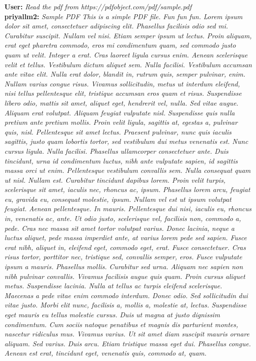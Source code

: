 \documentclass[11pt,addpoints,answers]{exam}
\begin{document}
\begin{questions}
\begin{tcolorbox}[fit,height=14cm, width=16cm, blank, borderline={1pt}{-2pt},nobeforeafter]
    \textbf{User:} \textit{Read the pdf from https://pdfobject.com/pdf/sample.pdf}
    \\
    \textbf{priyallm2:} \textit{Sample PDF This is a simple PDF file. Fun fun fun. Lorem ipsum dolor sit amet, consectetuer adipiscing elit. Phasellus facilisis odio sed mi. Curabitur suscipit. Nullam vel nisi. Etiam semper ipsum ut lectus. Proin aliquam, erat eget pharetra commodo, eros mi condimentum quam, sed commodo justo quam ut velit. Integer a erat. Cras laoreet ligula cursus enim. Aenean scelerisque velit et tellus. Vestibulum dictum aliquet sem. Nulla facilisi. Vestibulum accumsan ante vitae elit. Nulla erat dolor, blandit in, rutrum quis, semper pulvinar, enim. Nullam varius congue risus. Vivamus sollicitudin, metus ut interdum eleifend, nisi tellus pellentesque elit, tristique accumsan eros quam et risus. Suspendisse libero odio, mattis sit amet, aliquet eget, hendrerit vel, nulla. Sed vitae augue. Aliquam erat volutpat. Aliquam feugiat vulputate nisl. Suspendisse quis nulla pretium ante pretium mollis. Proin velit ligula, sagittis at, egestas a, pulvinar quis, nisl. Pellentesque sit amet lectus. Praesent pulvinar, nunc quis iaculis sagittis, justo quam lobortis tortor, sed vestibulum dui metus venenatis est. Nunc cursus ligula. Nulla facilisi. Phasellus ullamcorper consectetuer ante. Duis tincidunt, urna id condimentum luctus, nibh ante vulputate sapien, id sagittis massa orci ut enim. Pellentesque vestibulum convallis sem. Nulla consequat quam ut nisl. Nullam est. Curabitur tincidunt dapibus lorem. Proin velit turpis, scelerisque sit amet, iaculis nec, rhoncus ac, ipsum. Phasellus lorem arcu, feugiat eu, gravida eu, consequat molestie, ipsum. Nullam vel est ut ipsum volutpat feugiat. Aenean pellentesque. In mauris. Pellentesque dui nisi, iaculis eu, rhoncus in, venenatis ac, ante. Ut odio justo, scelerisque vel, facilisis non, commodo a, pede. Cras nec massa sit amet tortor volutpat varius. Donec lacinia, neque a luctus aliquet, pede massa imperdiet ante, at varius lorem pede sed sapien. Fusce erat nibh, aliquet in, eleifend eget, commodo eget, erat. Fusce consectetuer. Cras risus tortor, porttitor nec, tristique sed, convallis semper, eros. Fusce vulputate ipsum a mauris. Phasellus mollis. Curabitur sed urna. Aliquam nec sapien non nibh pulvinar convallis. Vivamus facilisis augue quis quam. Proin cursus aliquet metus. Suspendisse lacinia. Nulla at tellus ac turpis eleifend scelerisque. Maecenas a pede vitae enim commodo interdum. Donec odio. Sed sollicitudin dui vitae justo. Morbi elit nunc, facilisis a, mollis a, molestie at, lectus. Suspendisse eget mauris eu tellus molestie cursus. Duis ut magna at justo dignissim condimentum. Cum sociis natoque penatibus et magnis dis parturient montes, nascetur ridiculus mus. Vivamus varius. Ut sit amet diam suscipit mauris ornare aliquam. Sed varius. Duis arcu. Etiam tristique massa eget dui. Phasellus congue. Aenean est erat, tincidunt eget, venenatis quis, commodo at, quam.}
    \end{tcolorbox}
    

\end{questions}
\end{document}
